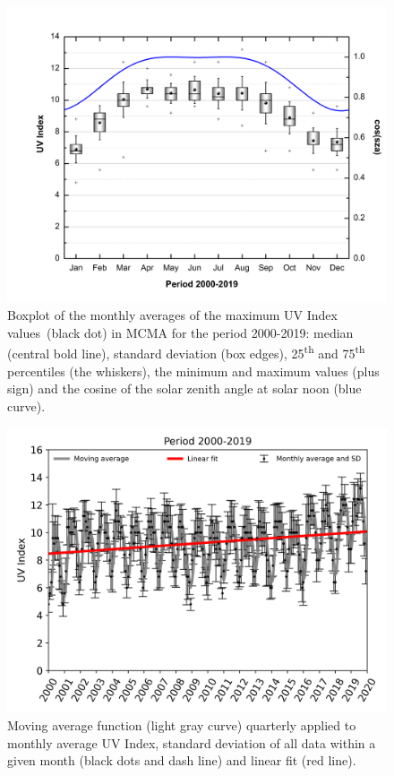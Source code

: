 \documentclass[journal=jacsat,manuscript=article]{achemso}
\begin{document}
\begin{figure}[H]
  \begin{center}
    \includegraphics[width=0.70\columnwidth]{figures/Boxplotcos}
    \caption{{Boxplot of the monthly averages of the maximum UV Index values~(black
          dot) in MCMA for the period 2000-2019: median (central bold line),
          standard deviation (box edges),
          25\textsuperscript{th} and 75\textsuperscript{th} percentiles (the whiskers),
          the minimum and maximum  values (plus sign) and the cosine of the solar zenith angle at solar
          noon (blue curve).
            {\label{310112}}%
        }}
  \end{center}
\end{figure}

\begin{figure}[H]
  \begin{center}
    \includegraphics[width=0.70\columnwidth]{figures/UV_Moving_Average}
    \caption{{Moving average function (light gray curve) quarterly applied to monthly
          average UV Index, standard deviation of all data within a given month
          (black dots and dash line) and linear fit (red line).
            {\label{185758}}%
        }}
  \end{center}
\end{figure}
\end{document}
